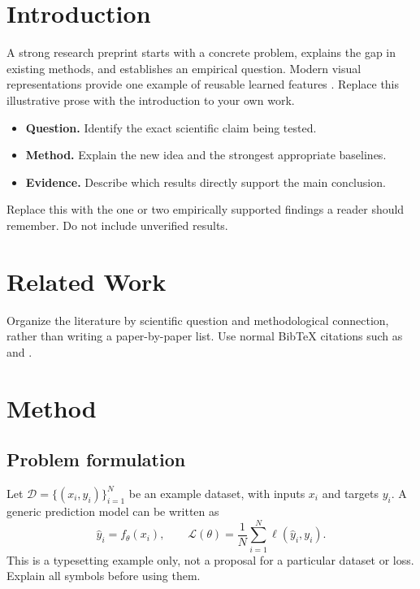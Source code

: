 \documentclass[11pt]{article}
\begin{document}
\twocolumn[{%
  \begin{minipage}{\textwidth}
    \makeillinoistitle
    \illustrativeteaser
    \vspace{8pt}
  \end{minipage}%
}]

\section{Introduction}
A strong research preprint starts with a concrete problem, explains the gap in existing methods, and establishes an empirical question. Modern visual representations provide one example of reusable learned features \citep{he2016deep,vaswani2017attention}. Replace this illustrative prose with the introduction to your own work.

\begin{itemize}
  \item \textbf{Question.} Identify the exact scientific claim being tested.
  \item \textbf{Method.} Explain the new idea and the strongest appropriate baselines.
  \item \textbf{Evidence.} Describe which results directly support the main conclusion.
\end{itemize}

\begin{takeaway}
Replace this with the one or two empirically supported findings a reader should remember. Do not include unverified results.
\end{takeaway}

\section{Related Work}
Organize the literature by scientific question and methodological connection, rather than writing a paper-by-paper list. Use normal BibTeX citations such as \citet{he2016deep} and \citet{vaswani2017attention}.

\section{Method}
\label{sec:method}
\subsection{Problem formulation}
Let $\mathcal{D}=\{(x_i,y_i)\}_{i=1}^{N}$ be an example dataset, with inputs $x_i$ and targets $y_i$. A generic prediction model can be written as
\begin{equation}
  \hat y_i = f_{\theta}(x_i),\qquad
  \mathcal{L}(\theta)=\frac{1}{N}\sum_{i=1}^{N}\ell(\hat y_i,y_i).
  \label{eq:objective}
\end{equation}
This is a typesetting example only, not a proposal for a particular dataset or loss. Explain all symbols before using them.
\end{document}
